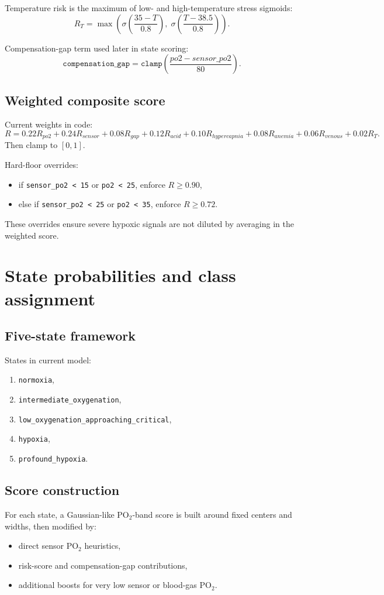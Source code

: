 \documentclass[12pt,a4paper]{article}
\begin{document}
Temperature risk is the maximum of low- and high-temperature stress sigmoids:
\[
R_T = \max\left(\sigma\left(\frac{35-T}{0.8}\right),\;\sigma\left(\frac{T-38.5}{0.8}\right)\right).
\]

Compensation-gap term used later in state scoring:
\[
\texttt{compensation\_gap}=\texttt{clamp}\left(\frac{po2-sensor\_po2}{80}\right).
\]

\subsection{Weighted composite score}
Current weights in code:
\[
R = 0.22R_{po2}+0.24R_{sensor}+0.08R_{gap}+0.12R_{acid}+0.10R_{hypercapnia}+0.08R_{anemia}+0.06R_{venous}+0.02R_T.
\]
Then clamp to $[0,1]$.

Hard-floor overrides:
\begin{itemize}
    \item if \texttt{sensor\_po2 < 15} or \texttt{po2 < 25}, enforce $R\ge 0.90$,
    \item else if \texttt{sensor\_po2 < 25} or \texttt{po2 < 35}, enforce $R\ge 0.72$.
\end{itemize}

These overrides ensure severe hypoxic signals are not diluted by averaging in the weighted score.

\section{State probabilities and class assignment}
\subsection{Five-state framework}
States in current model:
\begin{enumerate}
    \item \texttt{normoxia},
    \item \texttt{intermediate\_oxygenation},
    \item \texttt{low\_oxygenation\_approaching\_critical},
    \item \texttt{hypoxia},
    \item \texttt{profound\_hypoxia}.
\end{enumerate}

\subsection{Score construction}
For each state, a Gaussian-like PO$_2$-band score is built around fixed centers and widths, then modified by:
\begin{itemize}
    \item direct sensor PO$_2$ heuristics,
    \item risk-score and compensation-gap contributions,
    \item additional boosts for very low sensor or blood-gas PO$_2$.
\end{itemize}
\end{document}
